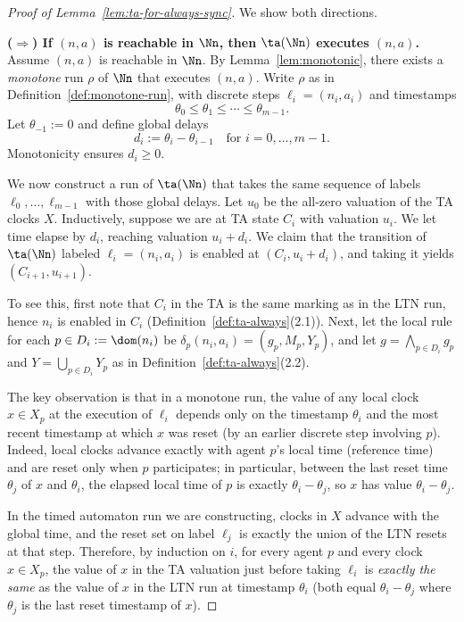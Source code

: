 \begin{proof}[Proof of Lemma~\ref{lem:ta-for-always-sync}]
We show both directions.

\medskip\noindent
\textbf{(\texorpdfstring{$\Rightarrow$}{=>}) If $(n,a)$ is reachable in $\Nn$, then $\ta(\Nn)$ executes $(n,a)$.}
Assume $(n,a)$ is reachable in $\Nn$. By Lemma~\ref{lem:monotonic}, there exists
a \emph{monotone} run $\rho$ of $\Nn$ that executes $(n,a)$.
Write $\rho$ as in Definition~\ref{def:monotone-run}, with discrete steps
$\ell_i=(n_i,a_i)$ and timestamps
\[
\theta_0 \le \theta_1 \le \cdots \le \theta_{m-1}.
\]
Let $\theta_{-1}:=0$ and define global delays
\[
d_i := \theta_i-\theta_{i-1} \quad \text{for } i=0,\ldots,m-1.
\]
Monotonicity ensures $d_i\ge 0$.

We now construct a run of $\ta(\Nn)$ that takes the same sequence of labels
$\ell_0,\ldots,\ell_{m-1}$ with those global delays.
Let $u_0$ be the all-zero valuation of the TA clocks $X$.
Inductively, suppose we are at TA state $C_i$ with valuation $u_i$. We let time
elapse by $d_i$, reaching valuation $u_i+d_i$.
We claim that the transition of $\ta(\Nn)$ labeled $\ell_i=(n_i,a_i)$ is enabled
at $(C_i,u_i+d_i)$, and taking it yields $(C_{i+1},u_{i+1})$.

To see this, first note that $C_i$ in the TA is the same marking as in the LTN
run, hence $n_i$ is enabled in $C_i$ (Definition~\ref{def:ta-always}(2.1)).
Next, let the local rule for each $p\in D_i:=\dom(n_i)$ be
$\delta_p(n_i,a_i)=(g_p,M_p,Y_p)$, and let $g=\bigwedge_{p\in D_i} g_p$ and
$Y=\bigcup_{p\in D_i} Y_p$ as in Definition~\ref{def:ta-always}(2.2).

The key observation is that in a monotone run, the value of any local clock
$x\in X_p$ at the execution of $\ell_i$ depends only on the timestamp $\theta_i$
and the most recent timestamp at which $x$ was reset (by an earlier discrete
step involving $p$). Indeed, local clocks advance exactly with agent $p$'s local
time (reference time) and are reset only when $p$ participates; in particular,
between the last reset time $\theta_j$ of $x$ and $\theta_i$, the elapsed local
time of $p$ is exactly $\theta_i-\theta_j$, so $x$ has value $\theta_i-\theta_j$.

In the timed automaton run we are constructing, clocks in $X$ advance with the
global time, and the reset set on label $\ell_j$ is exactly the union of the
LTN resets at that step. Therefore, by induction on $i$, for every agent $p$ and
every clock $x\in X_p$, the value of $x$ in the TA valuation just before taking
$\ell_i$ is \emph{exactly the same} as the value of $x$ in the LTN run at
timestamp $\theta_i$ (both equal $\theta_i-\theta_j$ where $\theta_j$ is the last
reset timestamp of $x$).


\end{proof}
